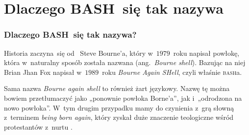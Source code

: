 \documentclass[10pt,t]{beamer}
\begin{document}























\appendix















\section{Dlaczego BASH~się tak nazywa}



\begin{frame}
  \frametitle{Dlaczego BASH~się tak nazywa?}


  Historia zaczyna~się
  od~
  {Steve Bourne’a}, który w~$1979$~roku napisał powłokę, która w~naturalny
  sposób została nazwana
  (ang.~\textit{Bourne shell}). Bazując na niej
  {Brian Jhan Fox} napisał w~$1989$~roku \textit{Bourne Again SHell},
  czyli właśnie
  {\textsc{bash}a}.

  Sama nazwa \textit{Bourne again shell} to również żart językowy. Nazwę tę
  można bowiem przetłumaczyć jako „ponownie powłoka Borne’a”, jak
  i~„odrodzona na nowo powłoka”. W~tym drugim przypadku mamy do czynienia
  z~grą słowną z~terminem
  {\textit{being born again}}, który zyskał
  duże znaczenie teologiczne wśród protestantów z~nurtu
  .


\end{frame}
\end{document}
